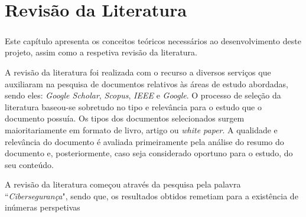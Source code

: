\chapter*{\thechapter \quad Revisão da Literatura}
\paragraph{}
Este capítulo apresenta os conceitos teóricos necessários ao desenvolvimento deste projeto, assim como a respetiva revisão da literatura.

A revisão da literatura foi realizada com o recurso a diversos serviços que auxiliaram na pesquisa de documentos relativos às áreas de estudo abordadas, sendo eles: \textit{Google Scholar}, \textit{Scopus}, \textit{IEEE} e \textit{Google}. O processo de seleção da literatura baseou-se sobretudo no tipo e relevância para o estudo que o documento possuía. Os tipos dos documentos selecionados surgem maioritariamente em formato de livro, artigo ou \textit{white paper}. A qualidade e relevância do documento é avaliada primeiramente pela análise do resumo do documento e, posteriormente, caso seja considerado oportuno para o estudo, do seu conteúdo.  

A revisão da literatura começou através da pesquisa pela palavra “\textit{Cibersegurança}", sendo que, os resultados obtidos remetiam para a existência de inúmeras perspetivas 